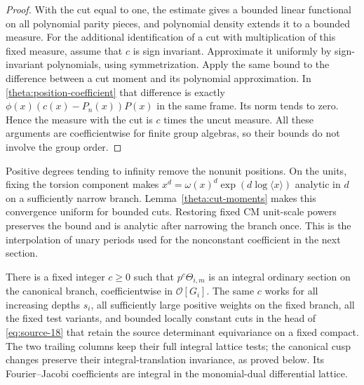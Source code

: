 \begin{proof}
With the cut equal to one, the estimate gives a bounded linear
functional on all polynomial parity pieces, and polynomial density
extends it to a bounded measure.  For the additional identification
of a cut with multiplication of this fixed measure, assume that
$c$ is sign invariant.  Approximate it uniformly by sign-invariant
polynomials, using symmetrization.  Apply the same bound to the
difference between a cut moment and its polynomial approximation.
In \eqref{theta:position-coefficient} that difference is exactly
$\phi(x)(c(x)-P_n(x))P(x)$ in the same frame.  Its norm tends to
zero.  Hence the measure with the cut is $c$ times the uncut
measure.  All these arguments are coefficientwise for finite group
algebras, so their bounds do not involve the group order.
\end{proof}

Positive degrees tending to infinity remove the nonunit positions.
On the units, fixing the torsion component makes
$x^d=\omega(x)^d\exp(d\log\langle x\rangle)$ analytic in $d$ on a
sufficiently narrow branch.  Lemma~\ref{theta:cut-moments} makes this
convergence uniform for bounded cuts.  Restoring fixed CM unit-scale
powers preserves the bound and is analytic after narrowing the
branch once.  This is the interpolation of unary periods used for
the nonconstant coefficient in the next section.

\begin{proposition}\label{theta:integral-family}
There is a fixed integer $c\geq0$ such that $p^c\Theta_{i,m}$ is an
integral ordinary section on the canonical branch, coefficientwise
in $\mathcal O[G_i]$.  The same $c$ works for all increasing depths
$s_i$, all sufficiently large positive weights on the fixed branch,
all the fixed test variants, and bounded locally constant cuts in
the head of \eqref{eq:source-18} that retain the source determinant
equivariance on a fixed compact.  The two trailing columns keep
their full integral lattice tests; the canonical cusp changes
preserve their integral-translation invariance, as proved below.
Its
Fourier--Jacobi coefficients are integral in the monomial-dual
differential lattice.
\end{proposition}

